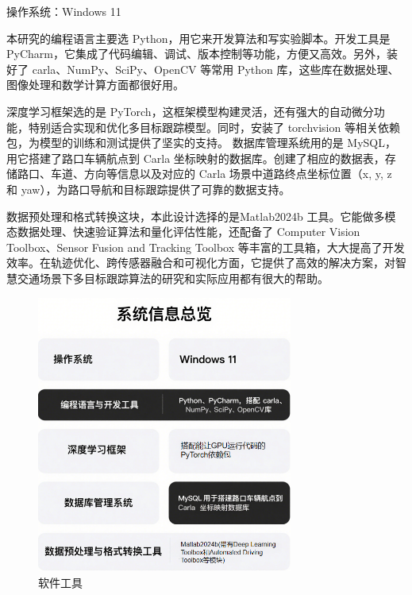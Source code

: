 操作系统：Windows 11

本研究的编程语言主要选 Python，用它来开发算法和写实验脚本。开发工具是 PyCharm，它集成了代码编辑、调试、版本控制等功能，方便又高效。另外，装好了 carla、NumPy、SciPy、OpenCV 等常用 Python 库，这些库在数据处理、图像处理和数学计算方面都很好用。

深度学习框架选的是 PyTorch，这框架模型构建灵活，还有强大的自动微分功能，特别适合实现和优化多目标跟踪模型。同时，安装了 torchvision 等相关依赖包，为模型的训练和测试提供了坚实的支持。
数据库管理系统用的是 MySQL，用它搭建了路口车辆航点到 Carla 坐标映射的数据库。创建了相应的数据表，存储路口、车道、方向等信息以及对应的 Carla 场景中道路终点坐标位置（x, y, z 和 yaw），为路口导航和目标跟踪提供了可靠的数据支持。

数据预处理和格式转换这块，本此设计选择的是Matlab2024b 工具。它能做多模态数据处理、快速验证算法和量化评估性能，还配备了 Computer Vision Toolbox、Sensor Fusion and Tracking Toolbox 等丰富的工具箱，大大提高了开发效率。在轨迹优化、跨传感器融合和可视化方面，它提供了高效的解决方案，对智慧交通场景下多目标跟踪算法的研究和实际应用都有很大的帮助。




\begin{figure}[htbp] %
	\centering
	\includegraphics[width=0.75\textwidth]{p31} %
	\caption{软件工具} %
	\label{fig:p31} %
\end{figure}









